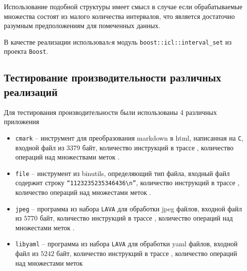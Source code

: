 Использование подобной структуры имеет смысл в случае если обрабатываемые множества состоят из малого количества интервалов, что является достаточно разумным предположениям для помеченных данных.

В качестве реализации использовалcя модуль \texttt{boost::icl::interval\_set} из проекта \texttt{Boost}.


\subsection{Тестирование производительности различных реализаций}

Для тестирования производительности были использованы 4 различных приложения

\begin{itemize}
    \item \texttt{cmark} -- инструмент для преобразования markdown в html, написанная на \texttt{C}, входной файл из $3379$ байт, количество инструкций в трассе , количество операций над множествами меток .
    \item \texttt{file} -- инструмент из binutils, определяющий тип файла, входный файл содержит строку \texttt{``1123235235346436\textbackslash n''}, количество инструкций в трассе , количество операций над множестами меток .
    \item \texttt{jpeg} -- программа из набора \texttt{LAVA} \cite{LAVA} для обработки jpeg файлов, входной файл из $5770$ байт, количество инструкций в трассе , количество операций над множестами меток .
    \item \texttt{libyaml} -- программа из набора \texttt{LAVA} для обработки yaml файлов, входной файл из $5242$ байт, количество инструкций в трассе , количество операций над множестами меток 
\end{itemize}

\begin{table}[H]
    \caption{Время работы в секундах для различных реализаций} \label{tab:compare}
\end{table}

